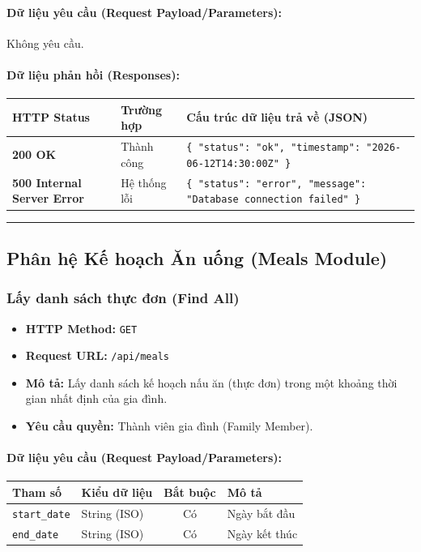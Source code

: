\documentclass[12pt,a4paper]{article}
\begin{document}
\paragraph{Dữ liệu yêu cầu (Request Payload/Parameters):}
Không yêu cầu.\\

\paragraph{Dữ liệu phản hồi (Responses):}
\begin{longtable}{|>{\raggedright\arraybackslash}p{2.8cm}|>{\raggedright\arraybackslash}p{3.2cm}|>{\raggedright\arraybackslash}p{8.0cm}|}
\hline
\textbf{HTTP Status} & \textbf{Trường hợp} & \textbf{Cấu trúc dữ liệu trả về (JSON)} \\ \hline
\endhead
\textbf{200 OK} & Thành công & \texttt{\{ "status": "ok", "timestamp": "2026-06-12T14:30:00Z" \}} \\ \hline
\textbf{500 Internal Server Error} & Hệ thống lỗi & \texttt{\{ "status": "error", "message": "Database connection failed" \}} \\ \hline
\end{longtable}

\vskip 0.4cm
\noindent\rule{\textwidth}{0.3pt}
\vskip 0.4cm

\subsection{Phân hệ Kế hoạch Ăn uống (Meals Module)}

\subsubsection{Lấy danh sách thực đơn (Find All)}
\begin{itemize}[leftmargin=*]
    \item \textbf{HTTP Method:} \texttt{GET}
    \item \textbf{Request URL:} \texttt{/api/meals}
    \item \textbf{Mô tả:} Lấy danh sách kế hoạch nấu ăn (thực đơn) trong một khoảng thời gian nhất định của gia đình.
    \item \textbf{Yêu cầu quyền:} Thành viên gia đình (Family Member).
\end{itemize}

\paragraph{Dữ liệu yêu cầu (Request Payload/Parameters):}
\begin{longtable}{|>{\raggedright\arraybackslash}p{2.8cm}|>{\raggedright\arraybackslash}p{2.2cm}|c|>{\raggedright\arraybackslash}p{7.0cm}|}
\hline
\textbf{Tham số} & \textbf{Kiểu dữ liệu} & \textbf{Bắt buộc} & \textbf{Mô tả} \\ \hline
\endhead
\texttt{start\_date} & String (ISO) & Có & Ngày bắt đầu \\ \hline
\texttt{end\_date} & String (ISO) & Có & Ngày kết thúc \\ \hline
\end{longtable}
\end{document}
